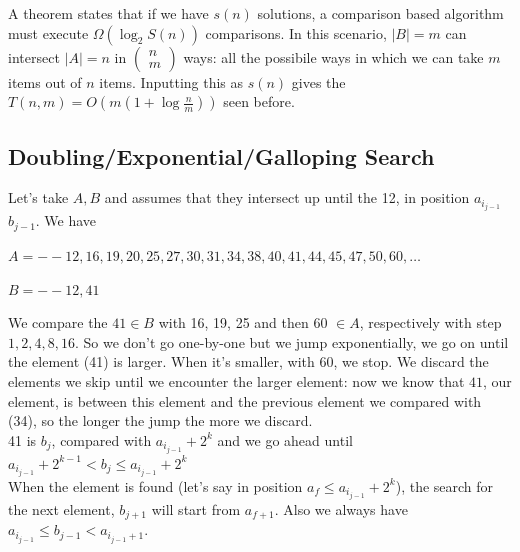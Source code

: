 \documentclass[10pt]{report}
\begin{document}
A theorem states that if we have $s(n)$ solutions, a comparison based algorithm must execute $\Omega(\log_2 S(n))$ comparisons. In this scenario, $|B| = m$ can intersect $|A| = n$ in $\left(\begin{array}{c}
n\\m
\end{array}\right)$ ways: all the possibile ways in which we can take $m$ items out of $n$ items. Inputting this as $s(n)$ gives the $T(n, m) = O(m(1 + \log\frac{n}{m}))$ seen before.
\subsection{Doubling/Exponential/Galloping Search} Let's take $A, B$ and assumes that they intersect up until the 12, in position $a_{i_{j-1}}$ $b_{j-1}$. We have
\begin{list}{}{}
	\item $A = -- 12, 16, 19, 20, 25, 27, 30, 31, 34, 38, 40, 41, 44, 45, 47, 50, 60,\ldots$
	\item $B = -- 12, 41$
\end{list}
We compare the $41\in B$ with 16, 19, 25 and then 60 $\in A$, respectively with step $1, 2, 4, 8, 16$. So we don't go one-by-one but we jump exponentially, we go on until the element (41) is larger. When it's smaller, with 60, we stop. We discard the elements we skip until we encounter the larger element: now we know that $41$, our element, is between this element and the previous element we compared with (34), so the longer the jump the more we discard.\\
41 is $b_j$, compared with $a_{i_{j-1}} + 2^k$ and we go ahead until $a_{i_{j-1}} + 2^{k-1} < b_j \leq a_{i_{j-1}} + 2^k$\\
When the element is found (let's say in position $a_f \leq a_{i_{j-1}} + 2^k$), the search for the next element, $b_{j+1}$ will start from $a_{f+1}$. Also we always have $a_{i_{j-1}} \leq b_{j-1} < a_{i_{j-1} +1}$.
\end{document}
